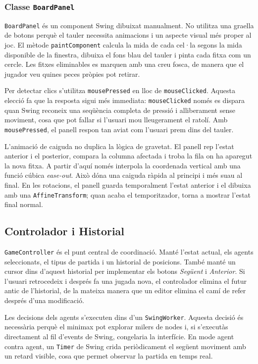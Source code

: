 \documentclass[conference,compsoc]{IEEEtran}
\begin{document}
\subsubsection{Classe \texttt{BoardPanel}}

\texttt{BoardPanel} és un component Swing dibuixat manualment. No utilitza una
graella de botons perquè el tauler necessita animacions i un aspecte visual més
proper al joc. El mètode \texttt{paintComponent} calcula la mida de cada cel·la
segons la mida disponible de la finestra, dibuixa el fons blau del tauler i pinta
cada fitxa com un cercle. Les fitxes eliminables es marquen amb una creu fosca,
de manera que el jugador veu quines peces pròpies pot retirar.

Per detectar clics s'utilitza \texttt{mousePressed} en lloc de
\texttt{mouseClicked}. Aquesta elecció fa que la resposta sigui més immediata:
\texttt{mouseClicked} només es dispara quan Swing reconeix una seqüència completa
de pressió i alliberament sense moviment, cosa que pot fallar si l'usuari mou
lleugerament el ratolí. Amb \texttt{mousePressed}, el panell respon tan aviat com
l'usuari prem dins del tauler.

L'animació de caiguda no duplica la lògica de gravetat. El panell rep l'estat
anterior i el posterior, compara la columna afectada i troba la fila on ha aparegut
la nova fitxa. A partir d'aquí només interpola la coordenada vertical amb una
funció cúbica \textit{ease-out}. Això dóna una caiguda ràpida al principi i més
suau al final. En les rotacions, el panell guarda temporalment l'estat anterior i
el dibuixa amb una \texttt{AffineTransform}; quan acaba el temporitzador, torna a
mostrar l'estat final normal.

\subsection{Controlador i Historial}

\texttt{GameController} és el punt central de coordinació. Manté l'estat actual,
els agents seleccionats, el tipus de partida i un historial de posicions. També
manté un cursor dins d'aquest historial per implementar els botons \textit{Següent}
i \textit{Anterior}. Si l'usuari retrocedeix i després fa una jugada nova, el
controlador elimina el futur antic de l'historial, de la mateixa manera que un
editor elimina el camí de refer després d'una modificació.

Les decisions dels agents s'executen dins d'un \texttt{SwingWorker}. Aquesta
decisió és necessària perquè el minimax pot explorar milers de nodes i, si
s'executàs directament al fil d'events de Swing, congelaria la interfície. En mode
agent contra agent, un \texttt{Timer} de Swing crida periòdicament el següent
moviment amb un retard visible, cosa que permet observar la partida en temps real.
\end{document}
